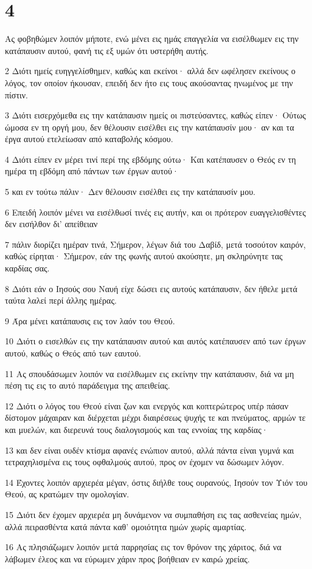 \chapter{4}

\par Ας φοβηθώμεν λοιπόν μήποτε, ενώ μένει εις ημάς επαγγελία να εισέλθωμεν εις την κατάπαυσιν αυτού, φανή τις εξ υμών ότι υστερήθη αυτής.
\par 2 Διότι ημείς ευηγγελίσθημεν, καθώς και εκείνοι· αλλά δεν ωφέλησεν εκείνους ο λόγος, τον οποίον ήκουσαν, επειδή δεν ήτο εις τους ακούσαντας ηνωμένος με την πίστιν.
\par 3 Διότι εισερχόμεθα εις την κατάπαυσιν ημείς οι πιστεύσαντες, καθώς είπεν· Ούτως ώμοσα εν τη οργή μου, δεν θέλουσιν εισέλθει εις την κατάπαυσίν μου· αν και τα έργα αυτού ετελείωσαν από καταβολής κόσμου.
\par 4 Διότι είπεν εν μέρει τινί περί της εβδόμης ούτω· Και κατέπαυσεν ο Θεός εν τη ημέρα τη εβδόμη από πάντων των έργων αυτού·
\par 5 και εν τούτω πάλιν· Δεν θέλουσιν εισέλθει εις την κατάπαυσίν μου.
\par 6 Επειδή λοιπόν μένει να εισέλθωσί τινές εις αυτήν, και οι πρότερον ευαγγελισθέντες δεν εισήλθον δι' απείθειαν
\par 7 πάλιν διορίζει ημέραν τινά, Σήμερον, λέγων διά του Δαβίδ, μετά τοσούτον καιρόν, καθώς είρηται· Σήμερον, εάν της φωνής αυτού ακούσητε, μη σκληρύνητε τας καρδίας σας.
\par 8 Διότι εάν ο Ιησούς σου Ναυή είχε δώσει εις αυτούς κατάπαυσιν, δεν ήθελε μετά ταύτα λαλεί περί άλλης ημέρας.
\par 9 Άρα μένει κατάπαυσις εις τον λαόν του Θεού.
\par 10 Διότι ο εισελθών εις την κατάπαυσιν αυτού και αυτός κατέπαυσεν από των έργων αυτού, καθώς ο Θεός από των εαυτού.
\par 11 Ας σπουδάσωμεν λοιπόν να εισέλθωμεν εις εκείνην την κατάπαυσιν, διά να μη πέση τις εις το αυτό παράδειγμα της απειθείας.
\par 12 Διότι ο λόγος του Θεού είναι ζων και ενεργός και κοπτερώτερος υπέρ πάσαν δίστομον μάχαιραν και διέρχεται μέχρι διαιρέσεως ψυχής τε και πνεύματος, αρμών τε και μυελών, και διερευνά τους διαλογισμούς και τας εννοίας της καρδίας·
\par 13 και δεν είναι ουδέν κτίσμα αφανές ενώπιον αυτού, αλλά πάντα είναι γυμνά και τετραχηλισμένα εις τους οφθαλμούς αυτού, προς ον έχομεν να δώσωμεν λόγον.
\par 14 Έχοντες λοιπόν αρχιερέα μέγαν, όστις διήλθε τους ουρανούς, Ιησούν τον Υιόν του Θεού, ας κρατώμεν την ομολογίαν.
\par 15 Διότι δεν έχομεν αρχιερέα μη δυνάμενον να συμπαθήση εις τας ασθενείας ημών, αλλά πειρασθέντα κατά πάντα καθ' ομοιότητα ημών χωρίς αμαρτίας.
\par 16 Ας πλησιάζωμεν λοιπόν μετά παρρησίας εις τον θρόνον της χάριτος, διά να λάβωμεν έλεος και να εύρωμεν χάριν προς βοήθειαν εν καιρώ χρείας.

